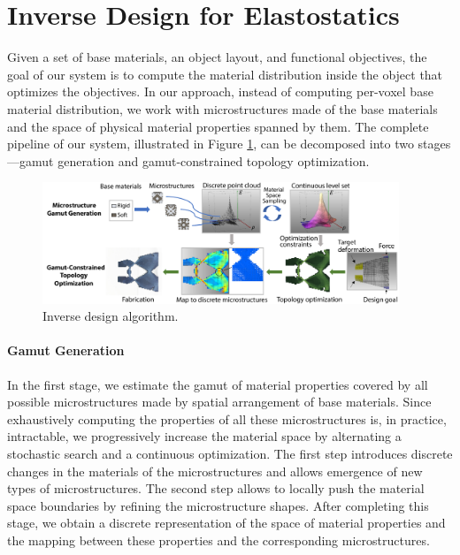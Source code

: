 \section{Inverse Design for Elastostatics}
Given a set of base materials, an object layout, and functional objectives, the goal of our system is to compute the material distribution inside the object that optimizes the objectives.
In our approach, instead of computing per-voxel base material distribution, we work with microstructures made of the base materials and the space of physical material properties spanned by them. The complete pipeline of our system, illustrated in Figure \ref{fig:topoptOverview}, can be decomposed into two stages---gamut generation and gamut-constrained topology optimization.
\begin{figure}
	\centering
	\includegraphics[width=0.95\textwidth]{images/topoptOverview.pdf}
	\caption{Inverse design algorithm.}
	\label{fig:topoptOverview}
\end{figure}
\paragraph{Gamut Generation}
In the first stage, we estimate the gamut of material properties covered by all possible microstructures made by spatial arrangement of base materials. 
Since exhaustively computing the properties of all these microstructures is, in practice, intractable, we progressively increase the material space by alternating a stochastic search and a continuous optimization. The first step introduces discrete changes in the materials of the microstructures and allows emergence of new types of microstructures. The second step allows to locally push the material space boundaries by refining the microstructure shapes. After completing this stage, we obtain a discrete representation of the space of material properties and the mapping between these properties and the corresponding microstructures.

